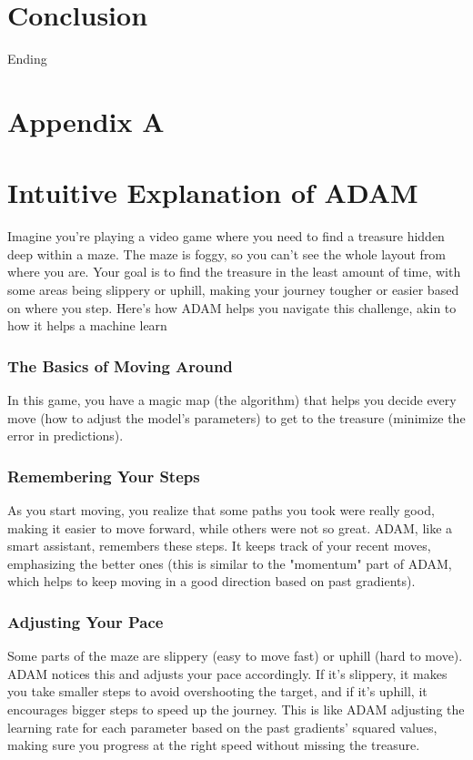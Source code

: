 \documentclass[journal]{IEEEtran}
\begin{document}
 
\section{Conclusion}
Ending




\onecolumn
\newpage
\pagestyle{fancy}

\section{Appendix A}
\section*{Intuitive Explanation of ADAM}
Imagine you're playing a video game where you need to find a treasure hidden deep within a maze. The maze is foggy, so you can't see the whole layout from where you are. Your goal is to find the treasure in the least amount of time, with some areas being slippery or uphill, making your journey tougher or easier based on where you step. Here's how ADAM helps you navigate this challenge, akin to how it helps a machine learn

\subsubsection*{The Basics of Moving Around}
In this game, you have a magic map (the algorithm) that helps you decide every move (how to adjust the model's parameters) to get to the treasure (minimize the error in predictions).

\subsubsection*{Remembering Your Steps}
As you start moving, you realize that some paths you took were really good, making it easier to move forward, while others were not so great. ADAM, like a smart assistant, remembers these steps. It keeps track of your recent moves, emphasizing the better ones (this is similar to the "momentum" part of ADAM, which helps to keep moving in a good direction based on past gradients).

\subsubsection*{Adjusting Your Pace}
Some parts of the maze are slippery (easy to move fast) or uphill (hard to move). ADAM notices this and adjusts your pace accordingly. If it's slippery, it makes you take smaller steps to avoid overshooting the target, and if it's uphill, it encourages bigger steps to speed up the journey. This is like ADAM adjusting the learning rate for each parameter based on the past gradients' squared values, making sure you progress at the right speed without missing the treasure.
\end{document}
